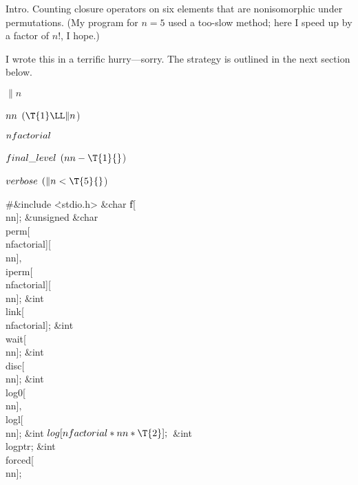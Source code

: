 
\datethis


Intro. Counting closure operators on six elements that are
nonisomorphic
under permutations. (My program for $n=5$ used a too-slow method;
here I speed up by a factor of $n!$, I hope.)

I wrote this in a terrific hurry---sorry. The strategy is outlined
in the next section below.

\Y\B\4\D$\|n$ \5
\par
\B\4\D$\\{nn}$ \5
$(\T{1}\LL\|n{}$)\par
\B\4\D$\\{nfactorial}$ \5
\par
\B\4\D$\\{final\_level}$ \5
$(\\{nn}-\T{1}{}$)\par
\B\4\D$\\{verbose}$ \5
$(\|n<\T{5}{}$)\par
\Y\B\8\#\&{include} \.{<stdio.h>}\6
\&{char} \|f[\\{nn}];\6
\&{unsigned} \&{char} \\{perm}[\\{nfactorial}][\\{nn}]${},{}$ \\{iperm}[%
\\{nfactorial}][\\{nn}];\6
\&{int} \\{link}[\\{nfactorial}];\6
\&{int} \\{wait}[\\{nn}];\6
\&{int} \\{disc}[\\{nn}];\6
\&{int} \\{log0}[\\{nn}]${},{}$ \\{logl}[\\{nn}];\6
\&{int} ${}\\{log}[\\{nfactorial}*\\{nn}*\T{2}];{}$\6
\&{int} \\{logptr};\6
\&{int} \\{forced}[\\{nn}];\6
